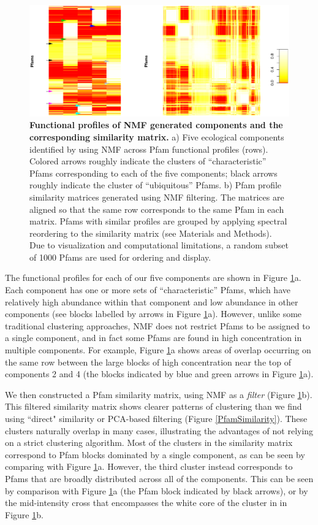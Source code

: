\begin{figure}
\centering
\includegraphics[width=\textwidth]{NMF/figures/fig2}
\caption[]{\textbf{Functional profiles of NMF generated components and the corresponding similarity matrix.} a) Five ecological components identified by using NMF across Pfam functional profiles (rows). Colored arrows roughly indicate the clusters of ``characteristic'' Pfams corresponding to each of the five components; black arrows roughly indicate the cluster of ``ubiquitous'' Pfams. b) Pfam profile similarity matrices generated using NMF filtering. The matrices are aligned so that the same row corresponds to the same Pfam in each matrix. Pfams with similar profiles are grouped by applying spectral reordering to the similarity matrix (see Materials and Methods). Due to visualization and computational limitations, a random subset of 1000 Pfams are used for ordering and display.}
\label{W}
\end{figure}

The functional profiles for each of our five components are shown in Figure \ref{W}a.  Each component has one or more sets of ``characteristic'' Pfams, which have relatively high abundance within that component and low abundance in other components (see blocks labelled by arrows in Figure \ref{W}a). However, unlike some traditional clustering approaches, NMF does not restrict Pfams to be assigned to a single component, and in fact some Pfams are found in high concentration in multiple components. For example, Figure \ref{W}a shows areas of overlap occurring on the same row between the large blocks of high concentration near the top of components 2 and 4 (the blocks indicated by blue and green arrows in Figure \ref{W}a).

We then constructed a Pfam similarity matrix, using NMF as a \emph{filter} (Figure \ref{W}b). This filtered similarity matrix shows clearer patterns of clustering than we find using ``direct" similarity or PCA-based filtering (Figure \ref{PfamSimilarity}). These clusters naturally overlap in many cases, illustrating the advantages of not relying on a strict clustering algorithm. Most of the clusters in the similarity matrix correspond to Pfam blocks dominated by a single component, as can be seen by comparing with Figure \ref{W}a. However, the third cluster instead corresponds to Pfams that are broadly distributed across all of the components.  This can be seen by comparison with Figure \ref{W}a (the Pfam block indicated by black arrows), or by the mid-intensity cross that encompasses the white core of the cluster in in Figure \ref{W}b.

